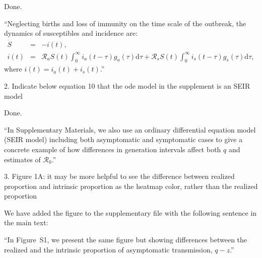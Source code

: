 \documentclass[12pt]{article}
\newcommand{\revtext}{\textsf}
\begin{document}
Done.

``Neglecting births and loss of immunity on the time scale of the outbreak, the dynamics of susceptibles and incidence are:
\begin{eqnarray}
\dot{S}&=&-i(t), \\
i(t)&=&\mathcal R_a S(t) \int_0^\infty i_a(t-\tau) g_a(\tau) \mathrm{d}\tau + \mathcal R_s S(t) \int_0^\infty i_s(t-\tau) g_s(\tau) \mathrm{d}\tau,
\end{eqnarray}
where $i(t) = i_a(t) + i_s(t)$.''

\revtext{2. Indicate below equation 10 that the ode model in the supplement is an SEIR model}

Done.

``In Supplementary Materials, we also use an ordinary differential equation model (SEIR model) including both asymptomatic and symptomatic cases to give a concrete example of how differences in generation intervals affect both $q$ and estimates of $\mathcal R_0$.''

\revtext{3. Figure 1A: it may be more helpful to see the difference between realized proportion and intrinsic proportion as the heatmap color, rather than the realized proportion}

We have added the figure to the supplementary file with the following sentence in the main text:

``In Figure~S1, we present the same figure but showing differences between the realized and the intrinsic proportion of asymptomatic transmission, $q-z$.''
\end{document}
